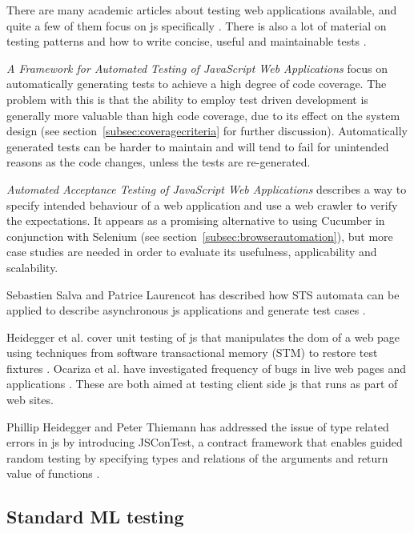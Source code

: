 \documentclass[11pt]{article}
\begin{document}
There are many academic articles about testing web applications available, and quite a few of them focus on \gls{js} specifically \cite{AutomatedTesting}\cite{ContractTesting}\cite{AutomatedAcceptance}\cite{Wild}\cite{DOMJavascript}. There is also a lot of material on testing patterns and how to write concise, useful and maintainable tests \cite[part~III]{TestPatterns}\cite[ch.~3-5]{BDDJS}\cite[p.~461-474]{Tddjs}\cite[p.~86-87]{TestableJS}\cite[p.~13-14]{JasmineBook}.

\emph{A Framework for Automated Testing of JavaScript Web Applications} \cite{AutomatedTesting} focus on automatically generating tests to achieve a high degree of code coverage. The problem with this is that the ability to employ test driven development is generally more valuable than high code coverage, due to its effect on the system design (see section~\ref{subsec:coveragecriteria} for further discussion). Automatically generated tests can be harder to maintain and will tend to fail for unintended reasons as the code changes, unless the tests are re-generated.

\emph{Automated Acceptance Testing of JavaScript Web Applications} \cite{AutomatedAcceptance} describes a way to specify intended behaviour of a web application and use a web crawler to verify the expectations. It appears as a promising alternative to using Cucumber in conjunction with Selenium (see section~\ref{subsec:browserautomation}), but more case studies are needed in order to evaluate its usefulness, applicability and scalability. %

Sebastien Salva and Patrice Laurencot has described how STS automata can be applied to describe asynchronous \gls{js} applications and generate test cases \cite{AutomatedAjax}.

Heidegger et al. cover unit testing of \gls{js} that manipulates the \gls{dom} of a web page using techniques from software transactional memory (STM) to restore test fixtures \cite{DOMJavascript}. Ocariza et al. have investigated frequency of bugs in live web pages and applications \cite{Wild}. These are both aimed at testing client side \gls{js} that runs as part of web sites.

Phillip Heidegger and Peter Thiemann has addressed the issue of type related errors in \gls{js} by introducing JSConTest, a contract framework that enables guided random testing by specifying types and relations of the arguments and return value of functions \cite{ContractTesting}.

\subsection{Standard ML testing}
\label{subsec:previousworksml}
\end{document}
